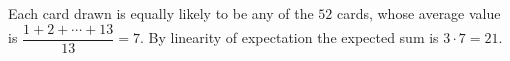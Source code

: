 Each card drawn is equally likely to be any of the $52$ cards, whose average value is $\dfrac{1+2+\cdots+13}{13}=7$. By linearity of expectation the expected sum is $3\cdot7=\boxed{21}$.
